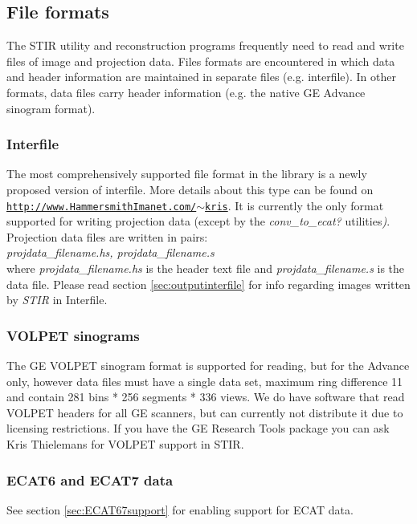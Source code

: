\documentclass{article}
\def\R2Lurl#1#2{\mbox{\href{#1}{\tt #2}}}
\begin{document}
\subsection{
File formats}

The STIR utility and reconstruction programs frequently need 
to read and write files of image and projection data. Files formats 
are encountered in which data and header information are maintained 
in separate files (e.g. interfile). In other formats, data files 
carry header information (e.g. the native GE Advance sinogram 
format).

\subsubsection{Interfile}

The most comprehensively supported file format in the library 
is a newly proposed version of interfile. More details about 
this type can be found on\\
\R2Lurl{http://www.HammersmithImanet.com/\ensuremath{\sim}kris}{http://www.HammersmithImanet.com/\ensuremath{\sim}kris}. 
It is currently the only format supported for writing projection 
data (except by the \textit{conv\_to\_ecat?} utilities\textit{)}. Projection 
data files are written in pairs:\\
\textit{projdata\_filename.hs, 
projdata\_filename.s}\\
where \textit{projdata\_filename.hs} is the header text file and \textit{projdata\_filename.s} 
is the data file. Please read section \ref{sec:outputinterfile} for info regarding 
images written by \textit{STIR} in Interfile.

\subsubsection{VOLPET sinograms}

The GE VOLPET sinogram format is supported for reading, but for
the Advance only, 
however data files must have a single data set, maximum ring 
difference 11 and contain 281 bins * 256 segments * 336 views. 
We do have software that read VOLPET headers for all GE scanners, but can currently
not distribute it due to licensing restrictions. If you have the
GE Research Tools package you can ask Kris Thielemans for VOLPET
support in STIR.

\subsubsection{ECAT6 and ECAT7 data} 
See section \ref{sec:ECAT67support} for enabling support for ECAT data.
\end{document}
